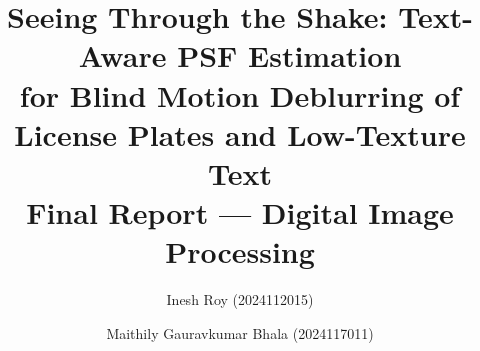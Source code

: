 \documentclass[11pt,a4paper]{article}
\title{\bfseries Seeing Through the Shake: Text-Aware PSF Estimation\\for Blind Motion Deblurring of License Plates and Low-Texture Text\\[6pt]\large Final Report --- Digital Image Processing}
\author{Inesh Roy (2024112015) \and Maithily Gauravkumar Bhala (2024117011)}
\date{}
\begin{document}
\maketitle
\thispagestyle{fancy}

\begin{abstract}

\end{abstract}









\appendix

\end{document}
